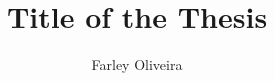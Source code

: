

% 
\documentclass[a4paper,11pt]{jreport}

\usepackage{graphicx} %
\usepackage{amsmath}
\usepackage{amsfonts}


\usepackage[left=25truemm,top=35truemm,right=25truemm,bottom=50truemm]{geometry}
\usepackage{times} %

\setcounter{tocdepth}{3}
\setcounter{page}{-1}

\setlength{\parskip}{0em}
\setlength{\topsep}{0em}


\usepackage{coins-jp-utf8}

\title{Title of the Thesis}
\author{Farley Oliveira}

\usepackage[english]{babel}
\renewcommand{\prechaptername}{Chap. }
\renewcommand{\postchaptername}{}


